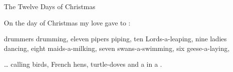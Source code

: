 \begin{SBSong}{The Twelve Days of Christmas}
  \begin{SBVerse}
	On the  day of Christmas my  love gave to :

	 drummers drumming, 
	eleven pipers piping, 
	ten Lords-a-leaping, 
	nine ladies dancing, 
	eight maids-a-milking, 
	seven swans-a-swimming, 
	six geese-a-laying,
	
	  \ldots 
	 calling birds, 
	 French hens, 
	 turtle-doves 
	and a  in a  .       
  \end{SBVerse}
\end{SBSong}
